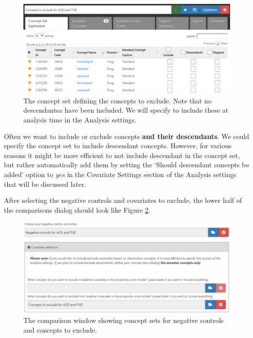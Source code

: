 \documentclass[11pt]{book}
\begin{document}
\begin{figure}

{\centering \includegraphics[width=1\linewidth]{images/PopulationLevelEstimation/covsToExclude} 

}

\caption{The concept set defining the concepts to exclude. Note that no descendantsa have been included. We will specify to include these at analysis time in the Analysis settings.}\label{fig:covsToExclude}
\end{figure}

Often we want to include or exclude concepts \textbf{and their
descendants}. We could specify the concept set to include descendant
concepts. However, for various reasons it might be more efficient to not
include descendant in the concept set, but rather automatically add them
by setting the `Should descendant concepts be added' option to
\emph{yes} in the Covariate Settings section of the Analysis settings
that will be discussed later.

After selecting the negative controls and covariates to exclude, the
lower half of the comparisons dialog should look like Figure
\ref{fig:comparisons2}.

\begin{figure}

{\centering \includegraphics[width=1\linewidth]{images/PopulationLevelEstimation/comparisons2} 

}

\caption{The comparison window showing concept sets for negative controls and concepts to exclude.}\label{fig:comparisons2}
\end{figure}
\end{document}
